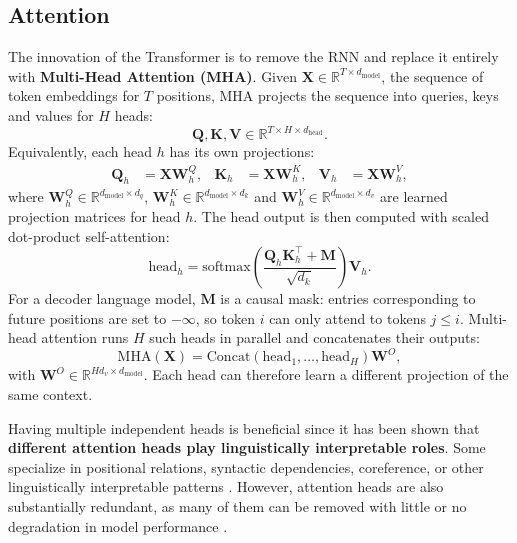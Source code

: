 \subsection{Attention}
The innovation of the Transformer is to remove the RNN and replace it entirely with
\textbf{Multi-Head Attention (MHA)}. Given $\mathbf{X} \in \mathbb{R}^{T \times d_{\mathrm{model}}}$,
the sequence of token embeddings for $T$ positions, MHA projects the sequence into queries, keys
and values for $H$ heads:
\begin{equation}
    \mathbf{Q}, \mathbf{K}, \mathbf{V}
    \in \mathbb{R}^{T \times H \times d_{\mathrm{head}}}.
\end{equation}
Equivalently, each head $h$ has its own projections:
\begin{align}
    \mathbf{Q}_h &= \mathbf{X}\mathbf{W}^{Q}_h, &
    \mathbf{K}_h &= \mathbf{X}\mathbf{W}^{K}_h, &
    \mathbf{V}_h &= \mathbf{X}\mathbf{W}^{V}_h,
\end{align}
where $\mathbf{W}^{Q}_h \in \mathbb{R}^{d_{\mathrm{model}} \times d_q}$, 
$\mathbf{W}^{K}_h \in \mathbb{R}^{d_{\mathrm{model}} \times d_k}$
and $\mathbf{W}^{V}_h \in \mathbb{R}^{d_{\mathrm{model}} \times d_v}$ are learned projection
matrices for head $h$. The head output is then computed with scaled dot-product self-attention:
\begin{equation}
    \mathrm{head}_h
    =
    \mathrm{softmax}\left(
        \frac{\mathbf{Q}_h \mathbf{K}_h^\top + \mathbf{M}}{\sqrt{d_k}}
    \right)\mathbf{V}_h .
\end{equation}
For a decoder language model, $\mathbf{M}$ is a causal mask: entries corresponding to future
positions are set to $-\infty$, so token $i$ can only attend to tokens $j \leq i$. Multi-head attention runs $H$ such heads in parallel and concatenates their outputs:
\begin{equation}
    \mathrm{MHA}(\mathbf{X})
    =
    \mathrm{Concat}\left(\mathrm{head}_1,\ldots,\mathrm{head}_H\right)\mathbf{W}^{O},
\end{equation}
with $\mathbf{W}^{O} \in \mathbb{R}^{H d_v \times d_{\mathrm{model}}}$. Each head can therefore
learn a different projection of the same context.

Having multiple independent heads is beneficial since it has been shown
that \textbf{different attention heads play linguistically interpretable roles}.
Some specialize in positional relations, syntactic
dependencies, coreference, or other linguistically interpretable patterns
\citep{clark-etal-2019-bert,voita-etal-2019-analyzing}. However, attention
heads are also substantially redundant, as many of them can be removed with
little or no degradation in model performance
\citep{michel-etal-2019-sixteen,voita-etal-2019-analyzing,
kovaleva-etal-2019-revealing}.


